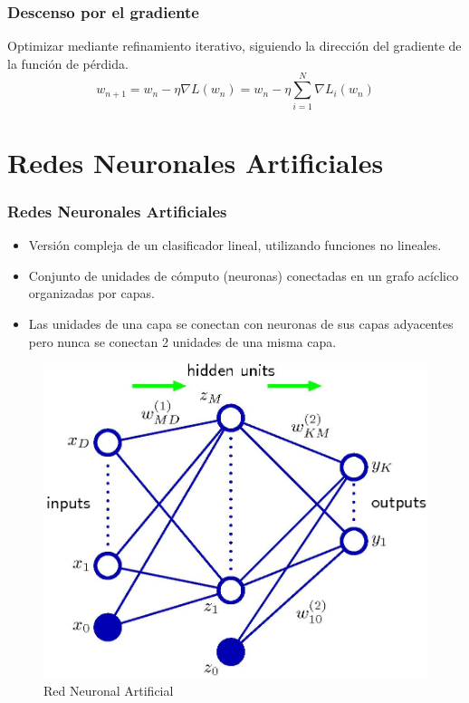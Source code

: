 \documentclass[10pt,center]{beamer}
\begin{document}
\begin{frame}
  \frametitle{Descenso por el gradiente}
    Optimizar mediante refinamiento iterativo, siguiendo la dirección del gradiente de la función de pérdida.
    \begin{equation}
      w_{n+1} = w_n - \eta \nabla L(w_n)  = w_n - \eta \sum_{i=1}^{N} \nabla L_i(w_n)
    \end{equation}
\end{frame}

\section{Redes Neuronales Artificiales}
\begin{frame}
  \frametitle{Redes Neuronales Artificiales}
    \begin{itemize}
      \item Versión compleja de un clasificador lineal, utilizando funciones no lineales.
      \item Conjunto de unidades de cómputo (neuronas) conectadas en un grafo acíclico organizadas por capas. 
      \item Las unidades de una capa se conectan con neuronas de sus capas adyacentes pero nunca se conectan 2 unidades de una misma capa.
    
    \end{itemize}

    
    \begin{figure}[ht]
      \begin{center}
	\includegraphics[height=0.5\textheight]{./img/bishop_neural_network.jpg}
      \end{center}
      \caption{Red Neuronal Artificial}
    \end{figure}
\end{frame}
\end{document}
